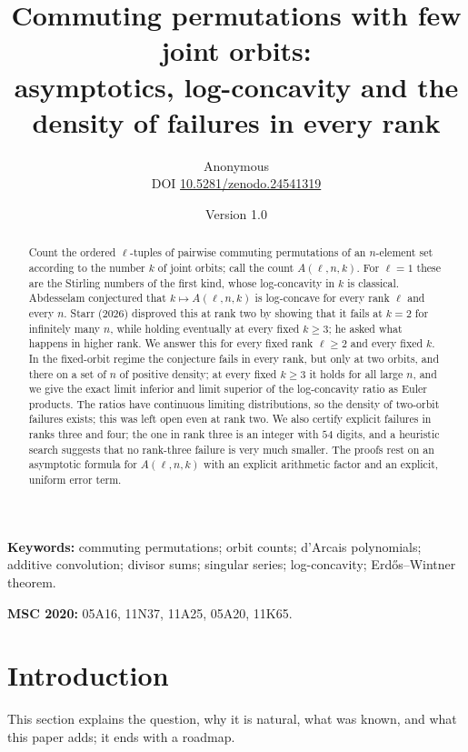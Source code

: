 \documentclass[11pt,a4paper]{article}
\title{Commuting permutations with few joint orbits:\\ asymptotics, log-concavity and the density of failures in every rank}
\author{Anonymous\\[3pt]{\small DOI \href{https://doi.org/10.5281/zenodo.24541319}{10.5281/zenodo.24541319}}}
\date{Version 1.0}
\theoremstyle{remark}
\numberwithin{equation}{section}
\begin{document}
\maketitle

\begin{abstract}
Count the ordered $\ell$-tuples of pairwise commuting permutations of an $n$-element set according to the number $k$ of joint orbits; call the count $A(\ell,n,k)$. For $\ell=1$ these are the Stirling numbers of the first kind, whose log-concavity in $k$ is classical. Abdesselam conjectured that $k\mapsto A(\ell,n,k)$ is log-concave for every rank $\ell$ and every $n$. Starr (2026) disproved this at rank two by showing that it fails at $k=2$ for infinitely many $n$, while holding eventually at every fixed $k\ge3$; he asked what happens in higher rank. We answer this for every fixed rank $\ell\ge2$ and every fixed $k$. In the fixed-orbit regime the conjecture fails in every rank, but only at two orbits, and there on a set of $n$ of positive density; at every fixed $k\ge3$ it holds for all large $n$, and we give the exact limit inferior and limit superior of the log-concavity ratio as Euler products. The ratios have continuous limiting distributions, so the density of two-orbit failures exists; this was left open even at rank two. We also certify explicit failures in ranks three and four; the one in rank three is an integer with $54$ digits, and a heuristic search suggests that no rank-three failure is very much smaller. The proofs rest on an asymptotic formula for $A(\ell,n,k)$ with an explicit arithmetic factor and an explicit, uniform error term.
\end{abstract}

\noindent\textbf{Keywords:} commuting permutations; orbit counts; d'Arcais polynomials; additive convolution; divisor sums; singular series; log-concavity; Erd\H{o}s--Wintner theorem.

\noindent\textbf{MSC 2020:} 05A16, 11N37, 11A25, 05A20, 11K65.

\section{Introduction}

This section explains the question, why it is natural, what was known, and what this paper adds; it ends with a roadmap.
\end{document}

